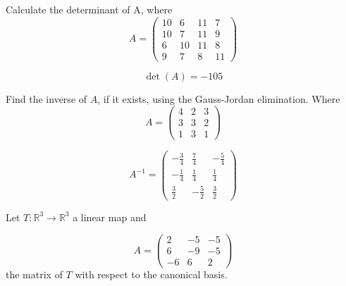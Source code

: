 \begin{questions}

\question Calculate the determinant of A, where
$$
A=\left(\begin{array}{rrrr}
10 & 6 & 11 & 7 \\
10 & 7 & 11 & 9 \\
6 & 10 & 11 & 8 \\
9 & 7 & 8 & 11
\end{array}\right)
$$

\begin{solution}
$$\det(A)=-105$$
\end{solution}

\question Find the inverse of $A$, if it exists, using the Gauss-Jordan elimination. Where
$$
A=\left(\begin{array}{rrr}
4 & 2 & 3 \\
3 & 3 & 2 \\
1 & 3 & 1
\end{array}\right)
$$

\begin{solution}
$$A^{-1}=\left(\begin{array}{rrr}
-\frac{3}{4} & \frac{7}{4} & -\frac{5}{4} \\
-\frac{1}{4} & \frac{1}{4} & \frac{1}{4} \\
\frac{3}{2} & -\frac{5}{2} & \frac{3}{2}
\end{array}\right)$$
\end{solution}

\question Let $T:\mathbb{R}^3\rightarrow\mathbb{R}^3$  a linear map and
 
$$
A=\left(\begin{array}{rrr}
2 & -5 & -5 \\
6 & -9 & -5 \\
-6 & 6 & 2
\end{array}\right)
$$
the matrix of $T$ with respect to the canonical basis.
\end{questions}
